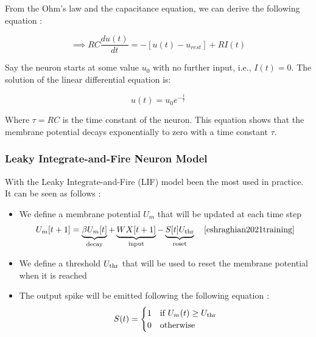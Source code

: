 \documentclass[11pt]{article}
\begin{document}
From the Ohm's law and the capacitance equation, we can derive the following equation :

\begin{equation}
  \implies RC \frac{du(t)}{dt} = -\left[u(t) - u_{rest} \right] + RI(t)
\end{equation}

Say the neuron starts at some value $u_{0}$ with no further input, i.e., $I(t)=0$. The solution of the linear differential equation is:

$$u(t) = u_0e^{-\frac{t}{\tau}}$$

Where $\tau = RC$ is the time constant of the neuron. This equation shows that the membrane potential decays exponentially to zero with a time constant $\tau$.

\subsubsection{Leaky Integrate-and-Fire Neuron Model}

With the Leaky Integrate-and-Fire (LIF) model been the most used in practice. It can be seen as follows :

\begin{itemize}
  \item We define a membrane potential $U_m$ that will be updated at each time step
        \begin{equation}
          U_m[t+1] = \underbrace{\beta U_m[t]}_\text{decay} + \underbrace{WX[t+1]}_\text{input} - \underbrace{S[t]U_{\rm thr}}_\text{reset}  \quad \text{\cite{eshraghian2021training}}
        \end{equation}

  \item We define a threshold $U_{\rm thr}$ that will be used to reset the membrane potential when it is reached
  \item The output spike will be emitted following the following equation :
        \begin{equation}
          S(t) = \begin{cases}
            1 & \text{if } U_m(t) \geq U_{\rm thr} \\
            0 & \text{otherwise}
          \end{cases}
        \end{equation}
\end{itemize}
\end{document}
